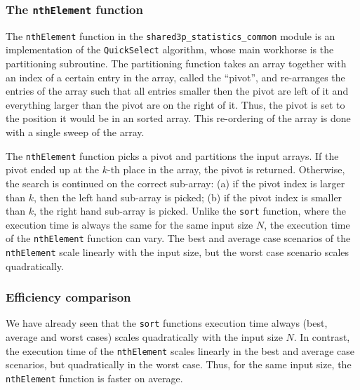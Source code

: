 \documentclass[11pt]{article}
\newcommand{\ct}[1]{\texttt{#1}}
\begin{document}
\subsubsection{The \ct{nthElement} function} %
\label{ssub:the_nthelement_function}

The \ct{nthElement} function in the \ct{shared3p\_statistics\_common} module is an implementation of the \ct{QuickSelect} algorithm, whose main workhorse is the partitioning subroutine. The partitioning function takes an array together with an index of a certain entry in the array, called the ``pivot'', and re-arranges the entries of the array such that all entries smaller then the pivot are left of it and everything larger than the pivot are on the right of it. Thus, the pivot is set to the position it would be in an sorted array. This re-ordering of the array is done with a single sweep of the array. 

The \ct{nthElement} function picks a pivot and partitions the input arrays. If the pivot ended up at the $k$-th place in the array, the pivot is returned. Otherwise, the search is continued on the correct sub-array: (a) if the pivot index is larger than $k$, then the left hand sub-array is picked; (b) if the pivot index is smaller than $k$, the right hand sub-array is picked. Unlike the \ct{sort} function, where the execution time is always the same for the same input size $N$, the execution time of the \ct{nthElement} function can vary. The best and average case scenarios of the \ct{nthElement} scale linearly with the input size, but the worst case scenario scales quadratically.  


\subsubsection{Efficiency comparison} %
\label{ssub:efficiency_comparison}


We have already seen that the \ct{sort} functions execution time always (best, average and worst cases) scales quadratically with the input size $N$. In contrast, the execution time of the \ct{nthElement} scales linearly in the best and average case scenarios, but quadratically in the worst case. Thus, for the same input size, the \ct{nthElement} function is faster on average.     
\end{document}

